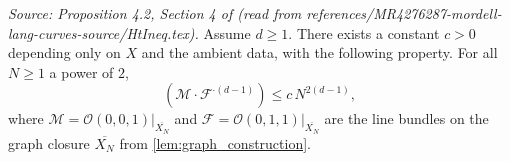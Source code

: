 \begin{lemma}
  \label{lem:siu_intersection_upper}
  \textit{Source: Proposition 4.2, Section 4 of \cite{MR4276287-mordell-lang-curves} (read from references/MR4276287-mordell-lang-curves-source/HtIneq.tex).}
  Assume \(d \ge 1\). There exists a constant \(c > 0\) depending only on \(X\) and
  the ambient data, with the following property. For all \(N \ge 1\) a power of \(2\),
  \[
    (\mathcal{M} \cdot \mathcal{F}^{\cdot(d-1)}) \le c\, N^{2(d-1)},
  \]
  where \(\mathcal{M} = \mathcal{O}(0,0,1)|_{\overline{X_N}}\) and
  \(\mathcal{F} = \mathcal{O}(0,1,1)|_{\overline{X_N}}\) are the line bundles
  on the graph closure \(\overline{X_N}\) from \cref{lem:graph_construction}.
\end{lemma}

